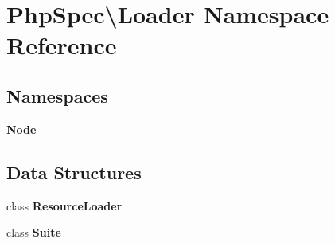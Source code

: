 \section{Php\+Spec\textbackslash{}Loader Namespace Reference}
\label{namespace_php_spec_1_1_loader}
\subsection*{Namespaces}
\begin{DoxyCompactItemize}
\item 
 {\bf Node}
\end{DoxyCompactItemize}
\subsection*{Data Structures}
\begin{DoxyCompactItemize}
\item 
class {\bf Resource\+Loader}
\item 
class {\bf Suite}
\end{DoxyCompactItemize}
